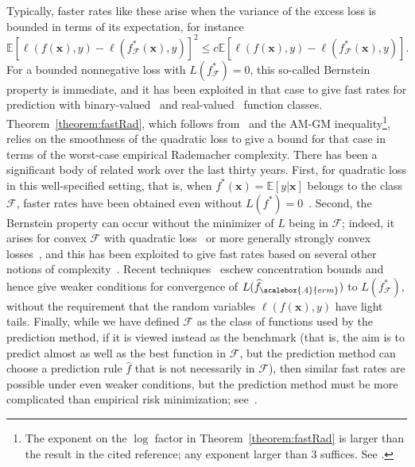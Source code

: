 Typically, faster rates like these arise when the variance of the excess loss is bounded in terms of its expectation, for instance
  \[
    {\mathbb E}\left[\ell(f({\boldsymbol x}),y)-\ell(f_{{\mathcal F}}^*({\boldsymbol x}),y)\right]^2 \le
c{\mathbb E}\left[\ell(f({\boldsymbol x}),y)-\ell(f_{{\mathcal F}}^*({\boldsymbol x}),y)\right].
  \]
For a bounded nonnegative loss with $L(f_{{\mathcal F}}^*)=0$, this so-called Bernstein property is immediate, and it has been exploited in that case to give fast rates for prediction with binary-valued~\cite{vc71,vc-tpr-74} and real-valued~\cite{h-dtgpmnn-92,p-urltep-95,bl-iudsam-99} function classes.  Theorem~\ref{theorem:fastRad}, which follows from~\cite[Theorem~1]{srebro2010optimistic} and the AM-GM inequality\footnote{The exponent on the $\log$ factor in
Theorem~\ref{theorem:fastRad} is larger than the result in the cited reference; any exponent larger than $3$ suffices. See
\cite[Equation~(1.4)]{rv-crpscb-06}.}, relies on the smoothness of the quadratic loss to give a bound for that case in terms of the worst-case empirical Rademacher complexity. There has been a significant body of related work over the last thirty years. First, for quadratic loss in this well-specified setting, that is, when $f^*({\boldsymbol x})={\mathbb E}[y|{\boldsymbol x}]$ belongs to the class ${\mathcal F}$, faster rates have been obtained even without $L(f^*)=0$~\cite{vdg-erf-90}.  Second, the Bernstein property can occur without the minimizer of $L$ being in ${\mathcal F}$; indeed, it arises for convex ${\mathcal F}$ with quadratic loss~\cite{lbw-ealnnbf-96} or more generally strongly convex losses~\cite{m-iscugd-02}, and this has been exploited to give fast rates based on several other notions of complexity~\cite{bbm-lrc-05,k-lrcaoiirm-06,pmlr-v40-Liang15}. Recent techniques~\cite{mendelson2020extending} eschew concentration bounds and hence give weaker conditions for convergence of $L(\widehat{f}_{\scalebox{.4}{erm}})$
to $L(f_{{\mathcal F}}^*)$, without the requirement that the random variables
$\ell(f({\boldsymbol x}),y)$ have light tails.  Finally, while we have defined ${\mathcal F}$ as the class of functions used by the prediction method, if it is viewed instead as the benchmark (that is, the aim is to predict almost as well as the best function in ${\mathcal F}$, but the prediction method can choose a prediction rule $\widehat f$ that is not necessarily in ${\mathcal F}$), then similar fast rates are possible under even weaker conditions, but the prediction method must be more complicated than empirical risk minimization; see~\cite{rakhlin2017empirical}.


